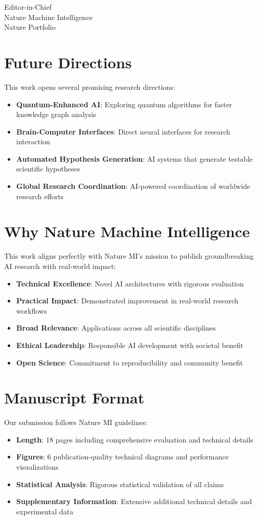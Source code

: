 \documentclass[11pt]{letter}
\begin{document}
\begin{letter}{Editor-in-Chief\\
Nature Machine Intelligence\\
Nature Portfolio}
\section*{Future Directions}

This work opens several promising research directions:

\begin{itemize}
    \item \textbf{Quantum-Enhanced AI}: Exploring quantum algorithms for faster knowledge graph analysis
    \item \textbf{Brain-Computer Interfaces}: Direct neural interfaces for research interaction
    \item \textbf{Automated Hypothesis Generation}: AI systems that generate testable scientific hypotheses
    \item \textbf{Global Research Coordination}: AI-powered coordination of worldwide research efforts
\end{itemize}

\section*{Why Nature Machine Intelligence}

This work aligns perfectly with Nature MI's mission to publish groundbreaking AI research with real-world impact:

\begin{itemize}
    \item \textbf{Technical Excellence}: Novel AI architectures with rigorous evaluation
    \item \textbf{Practical Impact}: Demonstrated improvement in real-world research workflows
    \item \textbf{Broad Relevance}: Applications across all scientific disciplines
    \item \textbf{Ethical Leadership}: Responsible AI development with societal benefit
    \item \textbf{Open Science}: Commitment to reproducibility and community benefit
\end{itemize}

\section*{Manuscript Format}

Our submission follows Nature MI guidelines:

\begin{itemize}
    \item \textbf{Length}: 18 pages including comprehensive evaluation and technical details
    \item \textbf{Figures}: 6 publication-quality technical diagrams and performance visualizations
    \item \textbf{Statistical Analysis}: Rigorous statistical validation of all claims
    \item \textbf{Supplementary Information}: Extensive additional technical details and experimental data
\end{itemize}


\end{letter}
\end{document}
